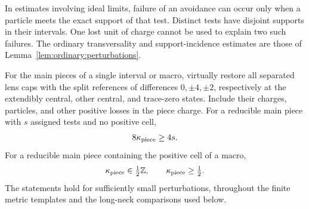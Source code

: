 In estimates involving ideal limits, failure of an avoidance can occur
only when a particle meets the exact support of that test.  Distinct
tests have disjoint supports in their intervals.  One lost unit of
charge cannot be used to explain two such failures.  The ordinary
transversality and support-incidence estimates are those of
Lemma~\ref{lem:ordinary:perturbations}.

\begin{lemma}
\label{lem:stack:charge-costs}
For the main pieces of a single interval or macro, virtually restore
all separated lens caps with the split references
of differences \(0,\pm4,\pm2\), respectively at the extendibly
central, other central, and trace-zero states.  Include their charges,
particles, and other positive losses in the piece charge.  For a
reducible main piece with \(s\) assigned tests and no positive cell,
\begin{equation}
 8\kappa_{\rm piece}\ge4s.
\label{eq:stack:negative-test-cost}
\end{equation}
For a reducible main piece containing the positive cell of a macro,
\begin{equation}
 \kappa_{\rm piece}\in\tfrac12\mathbb Z,\qquad
 \kappa_{\rm piece}\ge\tfrac12.
\label{eq:stack:positive-charge}
\end{equation}
The statements hold for sufficiently small perturbations, throughout
the finite metric templates and the long-neck comparisons used below.
\end{lemma}

